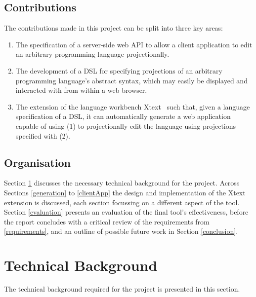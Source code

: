 \documentclass{article}
\begin{document}
\subsection{Contributions}
The contributions made in this project can be split into three key areas:

\begin{enumerate}
\item The specification of a server-side web API to allow a client application to edit an arbitrary programming language projectionally.
\item The development of a DSL for specifying projections of an arbitrary programming language's abstract syntax, which may easily be displayed and interacted with from within a web browser.
\item The extension of the language workbench Xtext~\cite{xtext} such that, given a language specification of a DSL, it can automatically generate a web application capable of using (1) to projectionally edit the language using projections specified with (2).
\end{enumerate}


\subsection{Organisation} 
Section \ref{technicalBackground} discusses the necessary technical background for the project. Across Sections \ref{generation} to \ref{clientApp} the design and implementation of the Xtext extension is discussed, each section focussing on a different aspect of the tool. Section \ref{evaluation} presents an evaluation of the final tool's effectiveness, before the report concludes with a critical review of the requirements from \ref{requirements}, and an outline of possible future work in Section \ref{conclusion}. 


\section{Technical Background}\label{technicalBackground}
The technical background required for the project is presented in this section.
\end{document}
